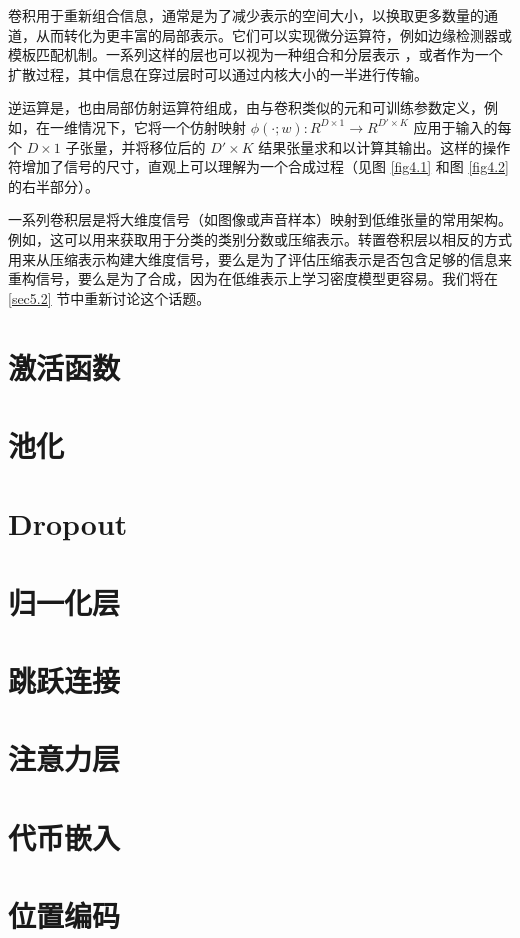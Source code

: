 卷积用于重新组合信息，通常是为了减少表示的空间大小，以换取更多数量的通道，从而转化为更丰富的局部表示。它们可以实现微分运算符，例如边缘检测器或模板匹配机制。一系列这样的层也可以视为一种组合和分层表示 \citep{arxiv-1311.2901}，或者作为一个扩散过程，其中信息在穿过层时可以通过内核大小的一半进行传输。

逆运算是，也由局部仿射运算符组成，由与卷积类似的元和可训练参数定义，例如，在一维情况下，它将一个仿射映射 $\phi(\cdot;w):R^{D \times 1} \to R^{D' \times K}$ 应用于输入的每个 $D \times 1$ 子张量，并将移位后的 $D' \times K$ 结果张量求和以计算其输出。这样的操作符增加了信号的尺寸，直观上可以理解为一个合成过程（见图 \ref{fig4.1} 和图 \ref{fig4.2} 的右半部分）。

一系列卷积层是将大维度信号（如图像或声音样本）映射到低维张量的常用架构。例如，这可以用来获取用于分类的类别分数或压缩表示。转置卷积层以相反的方式用来从压缩表示构建大维度信号，要么是为了评估压缩表示是否包含足够的信息来重构信号，要么是为了合成，因为在低维表示上学习密度模型更容易。我们将在 \ref{sec5.2} 节中重新讨论这个话题。

\section{激活函数}\label{sec4.3}

\section{池化}\label{sec4.4}

\section{Dropout}\label{sec4.5}

\section{归一化层}\label{sec4.6}

\section{跳跃连接}\label{sec4.7}

\section{注意力层}\label{sec4.8}

\section{代币嵌入}\label{sec4.9}

\section{位置编码}\label{sec4.10}